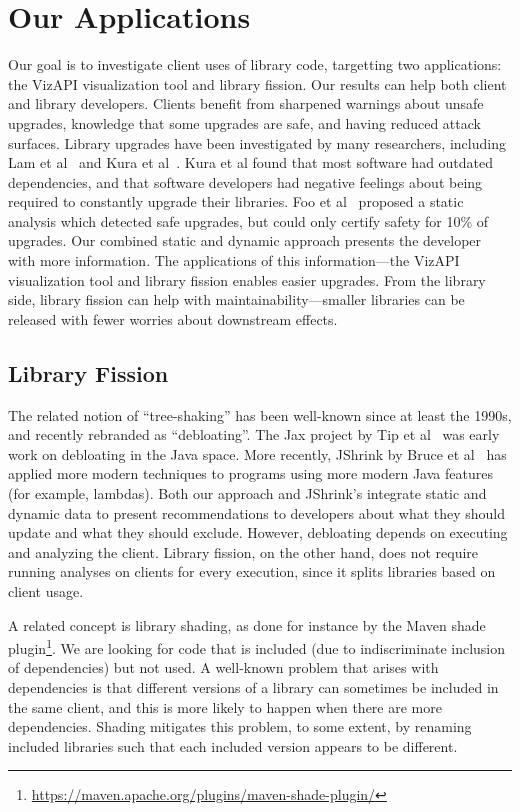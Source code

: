 \section{Our Applications}
Our goal is to investigate client uses of library code, targetting two applications: the VizAPI visualization tool and library fission. Our results can help both client and library developers. Clients benefit from sharpened warnings about unsafe upgrades, knowledge that some upgrades are safe, and having reduced attack surfaces. Library upgrades have been investigated by many researchers, including Lam et al~\cite{lam20:_puttin_seman_seman_version} and Kura et al~\cite{kula18:_do_devel_updat_their_librar_depen}. Kura et al found that most software had outdated dependencies, and that software developers had negative feelings about being required to constantly upgrade their libraries. Foo et al~\cite{foo18:_effic_static_check_librar_updat} proposed a static analysis which detected safe upgrades, but could only certify safety for 10\% of upgrades. Our combined static and dynamic approach presents the developer with more information. The applications of this information---the VizAPI visualization tool and library fission enables easier upgrades. From the library side, library fission can help with maintainability---smaller libraries can be released with fewer worries about downstream effects.

\subsection{Library Fission}
\label{sec:related-fission}

The related notion of ``tree-shaking'' has been well-known since at least the 1990s, and recently rebranded as ``debloating''.
The Jax project by Tip et al~\cite{tip02:_pract_extrac_techn_java} was early work on debloating in the Java space.
More recently, JShrink by Bruce et al~\cite{bruce20:_jshrin} has applied more modern techniques to programs using more modern Java features (for example, lambdas).
Both our approach and JShrink's integrate static and dynamic data to present recommendations to developers about what they should update and what they should exclude.
However, debloating depends on executing and analyzing the client. Library fission, on the other hand, does not require running analyses on clients for every execution, since it splits libraries based on client usage.

A related concept is library shading, as done for instance by the Maven shade plugin\footnote{\url{https://maven.apache.org/plugins/maven-shade-plugin/}}. We are looking for code that is included (due to indiscriminate inclusion of dependencies) but not used. A well-known problem that arises with dependencies is that different versions of a library can sometimes be included in the same client, and this is more likely to happen when there are more dependencies. Shading mitigates this problem, to some extent, by renaming included libraries such that each included version appears to be different.

